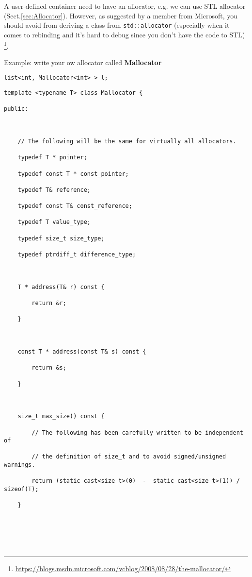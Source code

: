 A user-defined container need to have an allocator, e.g. we can use STL
allocator (Sect.\ref{sec:Allocator}). However,  as suggested by a member from
Microsoft, you should avoid from deriving a class from \verb!std::allocator!
(especially when it comes to rebinding and it's hard to debug since you don't
have the code to STL)
\footnote{\url{https://blogs.msdn.microsoft.com/vcblog/2008/08/28/the-mallocator/}}.

  
Example: write your ow allocator called {\bf Mallocator}
\begin{verbatim}
list<int, Mallocator<int> > l;
\end{verbatim}

{\tiny 
\begin{lstlisting}
template <typename T> class Mallocator {

public:

 

    // The following will be the same for virtually all allocators.

    typedef T * pointer;

    typedef const T * const_pointer;

    typedef T& reference;

    typedef const T& const_reference;

    typedef T value_type;

    typedef size_t size_type;

    typedef ptrdiff_t difference_type;

 

    T * address(T& r) const {

        return &r;

    }

 

    const T * address(const T& s) const {

        return &s;

    }

 

    size_t max_size() const {

        // The following has been carefully written to be independent of

        // the definition of size_t and to avoid signed/unsigned warnings.

        return (static_cast<size_t>(0)  -  static_cast<size_t>(1)) / sizeof(T);

    }

 

 


\end{lstlisting}}
